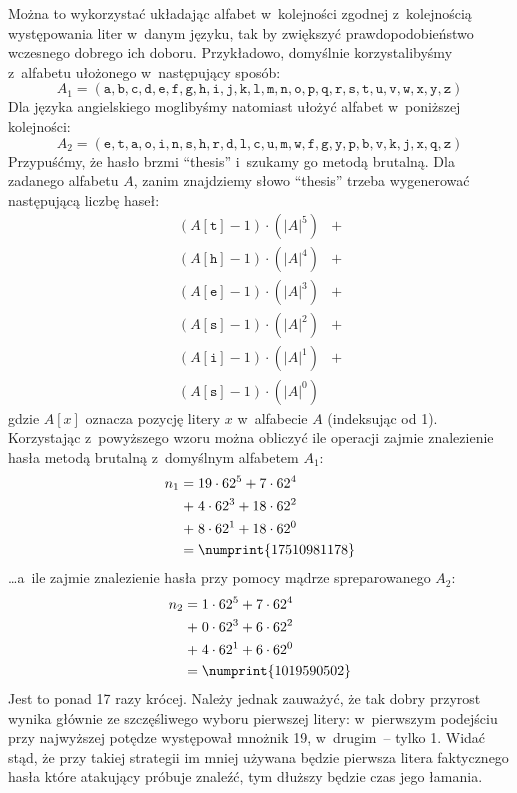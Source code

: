 Można to wykorzystać układając alfabet w~kolejności zgodnej z~kolejnością
występowania liter w~danym języku, tak by zwiększyć prawdopodobieństwo
wczesnego dobrego ich doboru. Przykładowo, domyślnie korzystalibyśmy
z~alfabetu ułożonego w~następujący sposób:
    $$A_1 = (
    \mathtt{a}, \mathtt{b}, \mathtt{c}, \mathtt{d}, \mathtt{e}, \mathtt{f},
    \mathtt{g}, \mathtt{h}, \mathtt{i}, \mathtt{j}, \mathtt{k}, \mathtt{l},
    \mathtt{m}, \mathtt{n}, \mathtt{o}, \mathtt{p}, \mathtt{q}, \mathtt{r},
    \mathtt{s}, \mathtt{t}, \mathtt{u}, \mathtt{v}, \mathtt{w}, \mathtt{x},
    \mathtt{y}, \mathtt{z})$$
Dla języka angielskiego moglibyśmy natomiast ułożyć alfabet w~poniższej
kolejności:
    $$A_2 = (
    \mathtt{e}, \mathtt{t}, \mathtt{a}, \mathtt{o}, \mathtt{i}, \mathtt{n},
    \mathtt{s}, \mathtt{h}, \mathtt{r}, \mathtt{d}, \mathtt{l}, \mathtt{c},
    \mathtt{u}, \mathtt{m}, \mathtt{w}, \mathtt{f}, \mathtt{g}, \mathtt{y},
    \mathtt{p}, \mathtt{b}, \mathtt{v}, \mathtt{k}, \mathtt{j}, \mathtt{x},
    \mathtt{q}, \mathtt{z})$$
\newpage
Przypuśćmy, że hasło brzmi ``thesis'' i~szukamy go metodą brutalną.
Dla zadanego alfabetu $A$, zanim znajdziemy słowo ``thesis'' trzeba wygenerować
następującą liczbę haseł:
    \[
        \begin{aligned}
        (A[\mathtt{t}]-1)\cdot(|A|^5) &+\\
        (A[\mathtt{h}]-1)\cdot(|A|^4) &+\\
        (A[\mathtt{e}]-1)\cdot(|A|^3) &+\\
        (A[\mathtt{s}]-1)\cdot(|A|^2) &+\\
        (A[\mathtt{i}]-1)\cdot(|A|^1) &+\\
        (A[\mathtt{s}]-1)\cdot(|A|^0)
        \end{aligned}
    \]
gdzie $A[x]$ oznacza pozycję litery $x$ w~alfabecie $A$ (indeksując od 1).
Korzystając z~powyższego wzoru można obliczyć ile operacji zajmie znalezienie
hasła metodą brutalną z~domyślnym alfabetem $A_1$:
    \[
        \begin{aligned}
        n_1=\;&19 \cdot 62^5 + 7 \cdot 62^4 \\
        +\;&4 \cdot 62^3 + 18 \cdot 62^2 \\
        +\;&8 \cdot 62^1 + 18 \cdot 62^0 \\
        =\;&\numprint{17510981178}
        \end{aligned}
    \]
\ldots a~ile zajmie znalezienie hasła przy pomocy mądrze spreparowanego
$A_2$:
    \[
        \begin{aligned}
        n_2=\;&1 \cdot 62^5 + 7 \cdot 62^4 \\
        +\;&0 \cdot 62^3 + 6 \cdot 62^2 \\
        +\;&4 \cdot 62^1 + 6 \cdot 62^0 \\
        =\;&\numprint{1019590502}
        \end{aligned}
    \]
Jest to ponad 17 razy krócej. Należy jednak zauważyć, że tak dobry przyrost
wynika głównie ze szczęśliwego wyboru pierwszej litery: w~pierwszym podejściu
przy najwyższej potędze występował mnożnik 19, w~drugim~-- tylko 1. Widać stąd,
że przy takiej strategii im mniej używana będzie pierwsza litera faktycznego
hasła które atakujący próbuje znaleźć, tym dłuższy będzie czas jego łamania.


